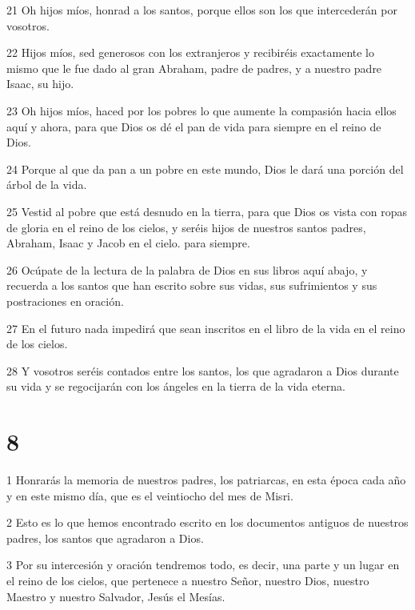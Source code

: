 \par 21 Oh hijos míos, honrad a los santos, porque ellos son los que intercederán por vosotros.

\par 22 Hijos míos, sed generosos con los extranjeros y recibiréis exactamente lo mismo que le fue dado al gran Abraham, padre de padres, y a nuestro padre Isaac, su hijo.

\par 23 Oh hijos míos, haced por los pobres lo que aumente la compasión hacia ellos aquí y ahora, para que Dios os dé el pan de vida para siempre en el reino de Dios.

\par 24 Porque al que da pan a un pobre en este mundo, Dios le dará una porción del árbol de la vida.

\par 25 Vestid al pobre que está desnudo en la tierra, para que Dios os vista con ropas de gloria en el reino de los cielos, y seréis hijos de nuestros santos padres, Abraham, Isaac y Jacob en el cielo. para siempre.

\par 26 Ocúpate de la lectura de la palabra de Dios en sus libros aquí abajo, y recuerda a los santos que han escrito sobre sus vidas, sus sufrimientos y sus postraciones en oración.

\par 27 En el futuro nada impedirá que sean inscritos en el libro de la vida en el reino de los cielos.

\par 28 Y vosotros seréis contados entre los santos, los que agradaron a Dios durante su vida y se regocijarán con los ángeles en la tierra de la vida eterna.

\chapter{8}

\par 1 Honrarás la memoria de nuestros padres, los patriarcas, en esta época cada año y en este mismo día, que es el veintiocho del mes de Misri.

\par 2 Esto es lo que hemos encontrado escrito en los documentos antiguos de nuestros padres, los santos que agradaron a Dios.

\par 3 Por su intercesión y oración tendremos todo, es decir, una parte y un lugar en el reino de los cielos, que pertenece a nuestro Señor, nuestro Dios, nuestro Maestro y nuestro Salvador, Jesús el Mesías.

